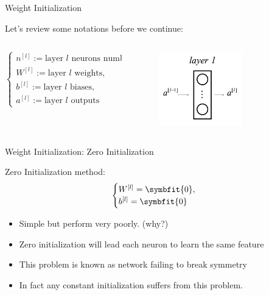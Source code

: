 \begin{frame}{Weight Initialization}
	\begin{block}{Let's review some notations before we continue:}
		\begin{columns}
			\begin{column}{0.4\textwidth}
				\[
				\begin{cases}
					n^{[l]} := \text{layer $l$ neurons number}, \\
					W^{[l]} := \text{layer $l$ weights},\\
					b^{[l]} := \text{layer $l$ biases}, \\
					a^{[l]} := \text{layer $l$ outputs}
				\end{cases}
				\]
			\end{column}\hfill
			\begin{column}{0.4\textwidth}
				\begin{figure}[H]
					\centering
					\includegraphics[width=0.65\textwidth]{Images/layer.png}
				\end{figure}
			\end{column}
		\end{columns}
	\end{block}
\end{frame}

\begin{frame}{Weight Initialization: Zero Initialization}
	\begin{block}{Zero Initialization method:}
		\[
		\begin{cases}
			W^{[l]} = \symbfit{0},\\
			b^{[l]} = \symbfit{0}
		\end{cases}
		\]
	\end{block}
	\hspace*{2em}
	\pause
	\begin{itemize}
		\item Simple but perform very poorly. (why?)
		\pause
		\item Zero initialization will lead each neuron to learn the same feature
		\item This problem is known as network {\color{red}failing to break symmetry}
		\item In fact any constant initialization suffers from this problem.
	\end{itemize}
\end{frame}

